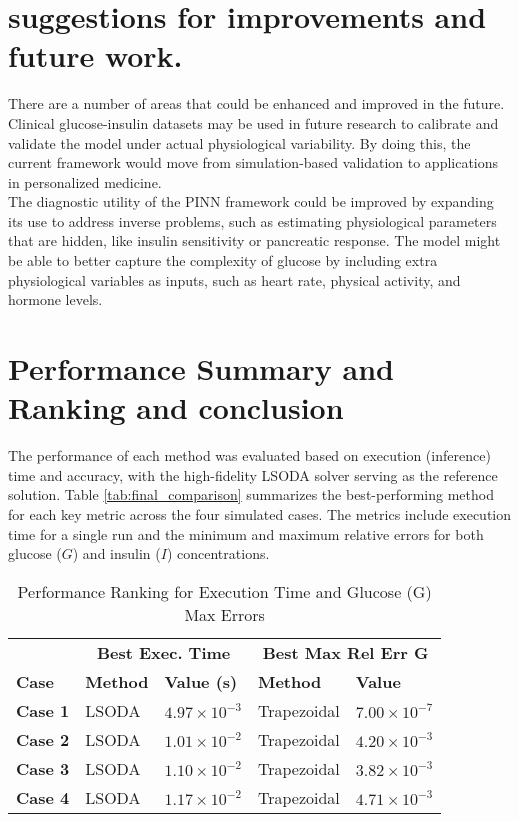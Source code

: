 \documentclass[conference]{IEEEtran}
\begin{document}
\section{suggestions for improvements and future work.}
There are a number of areas that could be enhanced and improved in the future.\\
Clinical glucose-insulin datasets may be used in future research to calibrate and validate the model under actual physiological variability. By doing this, the current framework would move from simulation-based validation to applications in personalized medicine.\\
The diagnostic utility of the PINN framework could be improved by expanding its use to address inverse problems, such as estimating physiological parameters that are hidden, like insulin sensitivity or pancreatic response.
The model might be able to better capture the complexity of glucose by including extra physiological variables as inputs, such as heart rate, physical activity, and hormone levels.

\section{Performance Summary and Ranking and conclusion}

The performance of each method was evaluated based on execution (inference) time and accuracy, with the high-fidelity LSODA solver serving as the reference solution. Table \ref{tab:final_comparison} summarizes the best-performing method for each key metric across the four simulated cases. The metrics include execution time for a single run and the minimum and maximum relative errors for both glucose ($G$) and insulin ($I$) concentrations.
\vspace{-0.7cm}

\begin{table}[H]
\caption{Performance Ranking for Execution Time and Glucose (G) Max Errors}
\centering
\begin{tabular}{@{}l l l l l@{}}
\toprule
& \multicolumn{2}{c}{\textbf{Best Exec. Time}} & \multicolumn{2}{c}{\textbf{Best Max Rel Err G}} \\
\cmidrule(lr){2-3} \cmidrule(lr){4-5}
\textbf{Case} & \textbf{Method} & \textbf{Value (s)} & \textbf{Method} & \textbf{Value} \\
\midrule
\textbf{Case 1} & LSODA & $4.97 \times 10^{-3}$ & Trapezoidal & $7.00 \times 10^{-7}$ \\
\textbf{Case 2} & LSODA & $1.01 \times 10^{-2}$ & Trapezoidal & $4.20 \times 10^{-3}$ \\
\textbf{Case 3} & LSODA & $1.10 \times 10^{-2}$ & Trapezoidal & $3.82 \times 10^{-3}$ \\
\textbf{Case 4} & LSODA & $1.17 \times 10^{-2}$ & Trapezoidal & $4.71 \times 10^{-3}$ \\
\bottomrule
\end{tabular}
\end{table}
\end{document}
